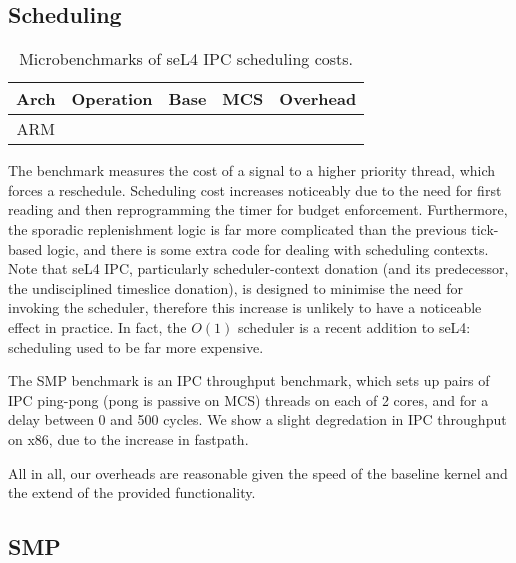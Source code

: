 \subsection{Scheduling}

\begin{table}[ht]\centering
\begin{tabular}{|c|l| r@{~}l | r@{~}l |r@{~}r|}\hline
\textbf{Arch}           & \multicolumn{1}{c|}{\textbf{Operation}}
                                & \multicolumn{2}{c|}{\textbf{Base}}
                                & \multicolumn{2}{c|}{\textbf{MCS}}
                                & \multicolumn{2}{c|}{\textbf{Overhead}} \\ \hline
\multirow{4}{*}{ARM}

\hline
\multirow{4}{*}{x64}

\hline
\end{tabular}
\caption{Microbenchmarks of seL4 IPC scheduling costs.}
\label{t:micro-schedule}
\end{table}

The  benchmark measures the cost of a signal to a higher priority thread, which forces a reschedule.
Scheduling cost increases noticeably due to the need for first reading
and then reprogramming the timer for budget enforcement. Furthermore,
the sporadic replenishment logic is far more complicated than the
previous tick-based logic, and there is some extra code for
dealing with scheduling contexts. Note that seL4 IPC,
particularly scheduler-context donation (and its predecessor, the
undisciplined timeslice donation), is designed to minimise the need for
invoking the scheduler, therefore this increase is unlikely to have
a noticeable effect in practice. In fact, the \(O(1)\) scheduler is a
recent addition to seL4: scheduling used to be far more expensive.

The SMP benchmark is an IPC throughput benchmark, which sets up pairs of IPC ping-pong
(pong is passive on MCS) threads on each of 2 cores, and for a delay between 0 and 500 cycles.
We show a slight degredation in IPC throughput on x86, due to the increase in fastpath.

All in all, our overheads are reasonable given the speed of the baseline kernel and the extend of
the provided functionality.

\subsection{SMP}

